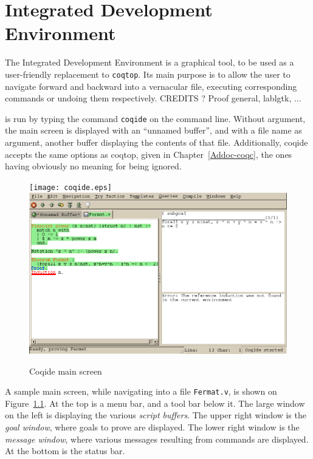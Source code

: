 \chapter{\Coq{} Integrated Development Environment}

The \Coq{} Integrated Development Environment is a graphical tool, to
be used as a user-friendly replacement to \texttt{coqtop}. Its main
purpose is to allow the user to navigate forward and backward into a
\Coq{} vernacular file, executing corresponding commands or undoing
them respectively. CREDITS ? Proof general, lablgtk, ...

\coqide{} is run by typing the command \verb|coqide| on the command
line. Without argument, the main screen is displayed with an ``unnamed
buffer'', and with a file name as argument, another buffer displaying
the contents of that file. Additionally, coqide accepts the same
options as coqtop, given in Chapter~\ref{Addoc-coqc}, the ones having
obviously no meaning for \coqide{} being ignored.

\begin{figure}[t]
\begin{center}
\ifx\pdfoutput\undefined   %
\texttt{[image: coqide.eps]}
\else
\includegraphics[width=1.0\textwidth]{coqide.png}
\fi
\end{center}
\caption{Coqide main screen}
\label{fig:coqide}
\end{figure}

A sample \coqide{} main screen, while navigating into a file
\verb|Fermat.v|, is shown on Figure~\ref{fig:coqide}.  At
the top is a menu bar, and a tool bar below it. The large window on
the left is displaying the various \emph{script buffers}. The upper right
window is the \emph{goal window}, where goals to 
prove are displayed. The lower right window is the \emph{message window},
where various messages resulting from commands are displayed. At the
bottom is the status bar.

